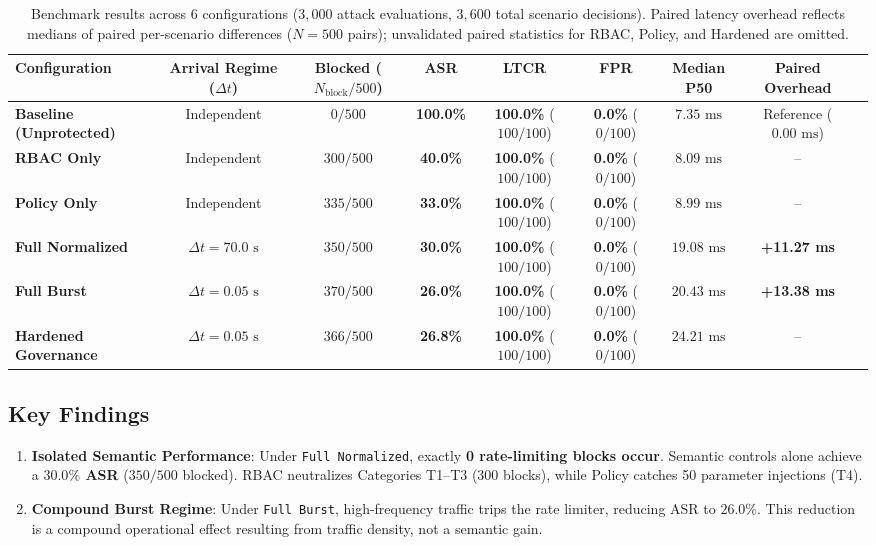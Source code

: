 \documentclass[10pt,twocolumn,letterpaper]{article}
\begin{document}
\begin{table}[t]
\centering
\small
\caption{Benchmark results across 6 configurations ($3{,}000$ attack evaluations, $3{,}600$ total scenario decisions). Paired latency overhead reflects medians of paired per-scenario differences ($N=500$ pairs); unvalidated paired statistics for RBAC, Policy, and Hardened are omitted.}
\label{tab:ablation}
\begin{tabular}{lcccccccc}
\toprule
\textbf{Configuration} & \textbf{Arrival Regime ($\Delta t$)} & \textbf{Blocked ($N_{\text{block}}/500$)} & \textbf{ASR} & \textbf{LTCR} & \textbf{FPR} & \textbf{Median P50} & \textbf{Paired Overhead} \\
\midrule
\textbf{Baseline (Unprotected)} & Independent & $0 / 500$ & \textbf{100.0\%} & \textbf{100.0\%} ($100/100$) & \textbf{0.0\%} ($0/100$) & $7.35\text{ ms}$ & Reference ($0.00\text{ ms}$) \\
\textbf{RBAC Only} & Independent & $300 / 500$ & \textbf{40.0\%} & \textbf{100.0\%} ($100/100$) & \textbf{0.0\%} ($0/100$) & $8.09\text{ ms}$ & -- \\
\textbf{Policy Only} & Independent & $335 / 500$ & \textbf{33.0\%} & \textbf{100.0\%} ($100/100$) & \textbf{0.0\%} ($0/100$) & $8.99\text{ ms}$ & -- \\
\textbf{Full Normalized} & $\Delta t = 70.0\text{ s}$ & $350 / 500$ & \textbf{30.0\%} & \textbf{100.0\%} ($100/100$) & \textbf{0.0\%} ($0/100$) & $19.08\text{ ms}$ & \textbf{+11.27 ms} \\
\textbf{Full Burst} & $\Delta t = 0.05\text{ s}$ & $370 / 500$ & \textbf{26.0\%} & \textbf{100.0\%} ($100/100$) & \textbf{0.0\%} ($0/100$) & $20.43\text{ ms}$ & \textbf{+13.38 ms} \\
\textbf{Hardened Governance} & $\Delta t = 0.05\text{ s}$ & $366 / 500$ & \textbf{26.8\%} & \textbf{100.0\%} ($100/100$) & \textbf{0.0\%} ($0/100$) & $24.21\text{ ms}$ & -- \\
\bottomrule
\end{tabular}
\end{table}

\subsection{Key Findings}
\begin{enumerate}
    \item \textbf{Isolated Semantic Performance}: Under \texttt{Full Normalized}, exactly \textbf{0 rate-limiting blocks occur}. Semantic controls alone achieve a \textbf{$30.0\%$ ASR} ($350/500$ blocked). RBAC neutralizes Categories T1--T3 ($300$ blocks), while Policy catches 50 parameter injections (T4).
    \item \textbf{Compound Burst Regime}: Under \texttt{Full Burst}, high-frequency traffic trips the rate limiter, reducing ASR to $26.0\%$. This reduction is a compound operational effect resulting from traffic density, not a semantic gain.
\end{enumerate}
\end{document}
